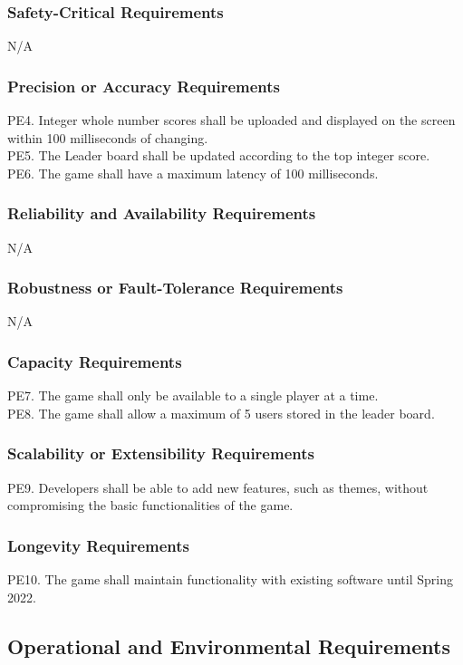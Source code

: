 \documentclass[12pt]{article}
\begin{document}
    \subsubsection{Safety-Critical Requirements}
    N/A
    
    \subsubsection{Precision or Accuracy Requirements}
    PE4. Integer whole number scores shall be uploaded and displayed on the screen within 100 milliseconds of changing.\\
    PE5. The Leader board shall be updated according to the top integer score.\\
    PE6. The game shall have a maximum latency of 100 milliseconds.
    
    \subsubsection{Reliability and Availability Requirements}
    N/A

    \subsubsection{Robustness or Fault-Tolerance Requirements}
    N/A
    
    \subsubsection{Capacity Requirements}
    PE7. The game shall only be available to a single player at a time.\\
    PE8. The game shall allow a maximum of 5 users stored in the leader board.
    
    \subsubsection{Scalability or Extensibility Requirements}
    PE9. Developers shall be able to add new features, such as themes, without compromising the basic functionalities of the game. 
    
    \subsubsection{Longevity Requirements}
    PE10. The game shall maintain functionality with existing software until Spring 2022.

\subsection{Operational and Environmental Requirements}
\end{document}
